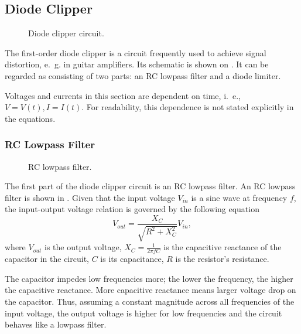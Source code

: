 \subsection{Diode Clipper}
\label{subsec:diode_clipper_intro}
\begin{figure}
  \centering
  
  \caption{Diode clipper circuit.}
  \label{fig:diode_clipper_circuit}
\end{figure}

The first-order diode clipper is a circuit frequently used to achieve signal distortion, e.\ g. in guitar amplifiers. Its schematic is shown on . It can be regarded as consisting of two parts: an RC lowpass filter and a diode limiter.

Voltages and currents in this section are dependent on time, i.\ e., $V = V(t), I= I(t)$. For readability, this dependence is not stated explicitly in the equations.

\subsubsection*{RC Lowpass Filter}

\begin{figure}
  \centering
  
  \caption{RC lowpass filter.}
  \label{fig:rc_lowpass}
\end{figure}

The first part of the diode clipper circuit is an RC lowpass filter. An RC lowpass filter is shown in . Given that the input voltage $V_{in}$ is a sine wave at frequency $f$, the input-output voltage relation is governed by the following equation
\begin{equation}
  V_{out} = \frac{X_C}{\sqrt{R^2 + X_C^2}} V_{in},
  \label{eq:rc_circuit}
\end{equation}
where $V_{out}$ is the output voltage, $X_C=\frac{1}{2\pi f C}$ is the capacitive reactance of the capacitor in the circuit, $C$ is its capacitance, $R$ is the resistor's resistance.

The capacitor impedes low frequencies more; the lower the frequency, the higher the capacitive reactance. More capacitive reactance means larger voltage drop on the capacitor. Thus, assuming a constant magnitude across all frequencies of the input voltage, the output voltage is higher for low frequencies and the circuit behaves like a lowpass filter.

